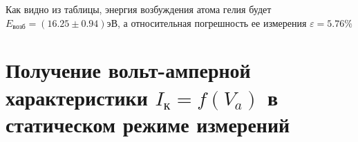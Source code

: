 \documentclass[12pt]{article}
\begin{document}
  \begin{figure}[h!]
  \end{figure}

  Как видно из таблицы, энергия возбуждения атома гелия будет $E_{возб} = (16.25 \pm 0.94) эВ$, а относительная
  погрешность ее измерения $\varepsilon = 5.76\%$

  \newpage

\section{Получение вольт-амперной характеристики $I_к = f(V_a)$ в статическом режиме измерений}
\end{document}
